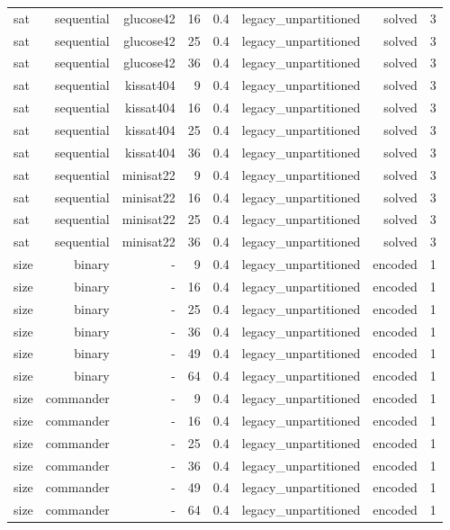 \begin{tabular}{lrrrrrrr}
sat & sequential & glucose42 & 16 & 0.4 & legacy\_unpartitioned & solved & 3 \\
sat & sequential & glucose42 & 25 & 0.4 & legacy\_unpartitioned & solved & 3 \\
sat & sequential & glucose42 & 36 & 0.4 & legacy\_unpartitioned & solved & 3 \\
sat & sequential & kissat404 & 9 & 0.4 & legacy\_unpartitioned & solved & 3 \\
sat & sequential & kissat404 & 16 & 0.4 & legacy\_unpartitioned & solved & 3 \\
sat & sequential & kissat404 & 25 & 0.4 & legacy\_unpartitioned & solved & 3 \\
sat & sequential & kissat404 & 36 & 0.4 & legacy\_unpartitioned & solved & 3 \\
sat & sequential & minisat22 & 9 & 0.4 & legacy\_unpartitioned & solved & 3 \\
sat & sequential & minisat22 & 16 & 0.4 & legacy\_unpartitioned & solved & 3 \\
sat & sequential & minisat22 & 25 & 0.4 & legacy\_unpartitioned & solved & 3 \\
sat & sequential & minisat22 & 36 & 0.4 & legacy\_unpartitioned & solved & 3 \\
size & binary & - & 9 & 0.4 & legacy\_unpartitioned & encoded & 1 \\
size & binary & - & 16 & 0.4 & legacy\_unpartitioned & encoded & 1 \\
size & binary & - & 25 & 0.4 & legacy\_unpartitioned & encoded & 1 \\
size & binary & - & 36 & 0.4 & legacy\_unpartitioned & encoded & 1 \\
size & binary & - & 49 & 0.4 & legacy\_unpartitioned & encoded & 1 \\
size & binary & - & 64 & 0.4 & legacy\_unpartitioned & encoded & 1 \\
size & commander & - & 9 & 0.4 & legacy\_unpartitioned & encoded & 1 \\
size & commander & - & 16 & 0.4 & legacy\_unpartitioned & encoded & 1 \\
size & commander & - & 25 & 0.4 & legacy\_unpartitioned & encoded & 1 \\
size & commander & - & 36 & 0.4 & legacy\_unpartitioned & encoded & 1 \\
size & commander & - & 49 & 0.4 & legacy\_unpartitioned & encoded & 1 \\
size & commander & - & 64 & 0.4 & legacy\_unpartitioned & encoded & 1 \\

\end{tabular}
